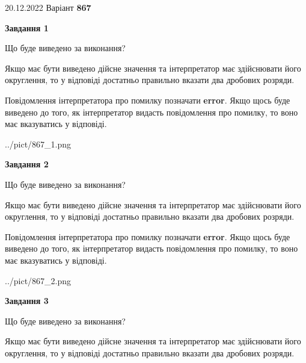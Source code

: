 \documentclass[12pt, ukrainian]{article}
\begin{document}
{20.12.2022 Варіант \No \textbf { 867 }\par}
{
\begin {Large}

{\begin {center}\textbf{Завдання 1}\end {center}}\par
Що буде виведено за виконання? \par

Якщо має бути виведено дійсне значення та інтерпретатор має здійснювати його округлення, 
то у відповіді достатньо правильно вказати два дробових розряди.

Повідомлення інтерпретатора про помилку позначати \textbf{error}.
Якщо щось буде виведено до того, як інтерпретатор видасть повідомлення про помилку, 
то воно має вказуватись у відповіді. \par

\begin{center}
	{../pict/867_1.png}
\end{center}
\newpage

{\begin {center}\textbf{Завдання 2}\end {center}}\par
Що буде виведено за виконання? \par

Якщо має бути виведено дійсне значення та інтерпретатор має здійснювати його округлення, 
то у відповіді достатньо правильно вказати два дробових розряди.

Повідомлення інтерпретатора про помилку позначати \textbf{error}.
Якщо щось буде виведено до того, як інтерпретатор видасть повідомлення про помилку, 
то воно має вказуватись у відповіді. \par

\begin{center}
	{../pict/867_2.png}
\end{center}
\newpage

{\begin {center}\textbf{Завдання 3}\end {center}}\par
Що буде виведено за виконання? \par

Якщо має бути виведено дійсне значення та інтерпретатор має здійснювати його округлення, 
то у відповіді достатньо правильно вказати два дробових розряди.


\end{Large}}
\end{document}
